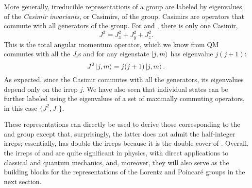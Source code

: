 \begin{definition}
\label{def:01_casimir}
More generally, irreducible representations of a group are labeled by eigenvalues of the \textit{Casimir invariants}, or Casimirs, of the group.
Casimirs are operators that commute with all generators of the group.
For \so[3] and \su[2], there is only one Casimir,
\begin{equation}
\label{eq:01_so3_su2_casimir}
J^2 = J_x^2 + J_y^2 + J_z^2.
\end{equation}
This is the total angular momentum operator, which we know from QM commutes with all the $J_i$s and for any eigenstate $\ket{j, m}$ has eigenvalue $j(j+1)$:
\begin{equation}
\label{eq:01_so3_su2_casimir_eigenvalue}
J^2\ket{j, m} = j(j+1)\ket{j, m}.
\end{equation}
As expected, since the Casimir commutes with all the generators, its eigenvalues depend only on the irrep $j$.
We have also seen that individual states can be further labeled using the eigenvalues of a set of maximally commuting operators, in this case $\{J^2, J_z\}$.
\end{definition}

These representations can directly be used to derive those corresponding to the \SU[2] and \SO[3] group except that, surprisingly, the latter does not admit the half-integer irreps; essentially, \SU[2] has double the irreps because it is the double cover of \SO[3].
Overall, the irreps of \su[2] and \su[3] are quite significant in physics, with direct applications to classical and quantum mechanics, and, moreover, they will also serve as the building blocks for the representations of the Lorentz and Poincaré groups in the next section.




